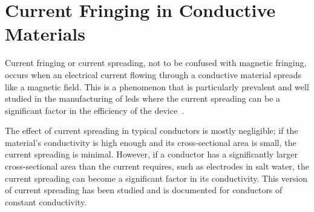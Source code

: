 

\section{Current Fringing in Conductive Materials}

Current fringing or current spreading, not to be confused with magnetic fringing, occurs when an electrical current flowing through a conductive material spreads like a magnetic field.
This is a phenomenon that is particularly prevalent and well studied in the manufacturing of \glspl{led} where the current spreading can be a significant factor in the efficiency of the device~\cite{solomentsev_LED_current_spreading_2022, hwang_LED_current_spreading_2008, jeon_LED_current_spreading_2001}.

The effect of current spreading in typical conductors is mostly negligible; if the material's conductivity is high enough and its cross-sectional area is small, the current spreading is minimal.
However, if a conductor has a significantly larger cross-sectional area than the current requires, such as electrodes in salt water, the current spreading can become a significant factor in its conductivity.
This version of current spreading has been studied and is documented for conductors of constant conductivity.~\cite{jason_current_spreading_long_objects_2008}

